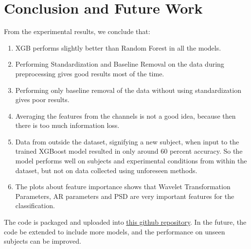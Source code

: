 
\chapter{Conclusion and Future Work} %

\label{Chapter8} %


From the experimental results, we conclude that:
\begin{enumerate}
    \item XGB performs slightly better than Random Forest in all the models.
    \item Performing Standardization and Baseline Removal on the data during preprocessing gives good results most of the time.
    \item Performing only baseline removal of the data without using standardization gives poor results.
    \item Averaging the features from the channels is not a good idea, because then there is too much information loss.
    \item Data from outside the dataset, signifying a new subject, when input to the trained XGBoost model resulted in only around 60 percent accuracy. So the model performs well on subjects and experimental conditions from within the dataset, but not on data collected using unforeseen methods.
    \item The plots about feature importance shows that Wavelet Transformation Parameters, AR parameters and PSD are very important features for the classification.
\end{enumerate}

The code is packaged and uploaded into \href{https://github.com/nascarsayan/mahnob-emotion-detection}{this github repository}. In the future, the code be extended to include more models, and the performance on unseen subjects can be improved.